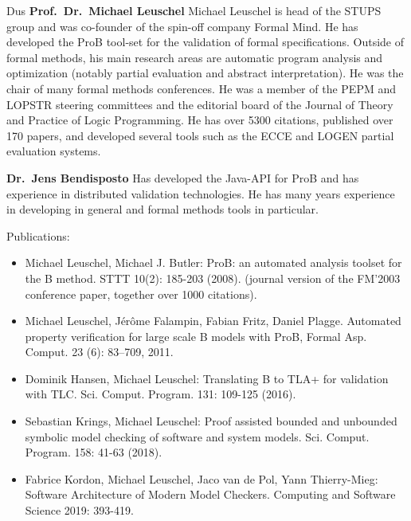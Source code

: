 \begin{sitedescription}{Dus}
\textbf{Prof.\ Dr.\ Michael Leuschel}
Michael Leuschel is head of the STUPS group and was co-founder of the spin-off
company Formal Mind.
He has developed the ProB tool-set for the validation of formal specifications.
Outside of formal methods, his main research areas are automatic program analysis and optimization (notably partial evaluation and abstract interpretation).
He was the chair of many formal methods conferences.
He was a member of the PEPM and LOPSTR steering committees and
 the editorial board of the Journal of Theory and Practice of Logic Programming.
He has over 5300 citations, published over 170 papers, 
and developed several tools such as the ECCE and LOGEN partial evaluation systems.

\textbf{Dr.\ Jens Bendisposto}
Has developed the Java-API for ProB and has experience in distributed validation technologies.
He has many years experience in developing in general and formal methods tools in particular.



Publications:
\begin{itemize}
\item Michael Leuschel, Michael J. Butler: ProB: an automated analysis toolset for the B method. STTT 10(2): 185-203 (2008).
 (journal version of the FM'2003 conference paper, together over 1000 citations).
\item Michael Leuschel, J{\'e}r{\^o}me Falampin, Fabian Fritz, Daniel Plagge.
Automated property verification for large scale {B} models with {ProB},
Formal Asp. Comput. 23 (6): 83--709, 2011.
\item Dominik Hansen, Michael Leuschel: Translating B to TLA+ for validation with TLC. Sci. Comput. Program. 131: 109-125 (2016).
\item Sebastian Krings, Michael Leuschel:
Proof assisted bounded and unbounded symbolic model checking of software and system models. Sci. Comput. Program. 158: 41-63 (2018).
\item Fabrice Kordon, Michael Leuschel, Jaco van de Pol, Yann Thierry-Mieg:
Software Architecture of Modern Model Checkers. Computing and Software Science 2019: 393-419.
\end{itemize}


\end{sitedescription}

